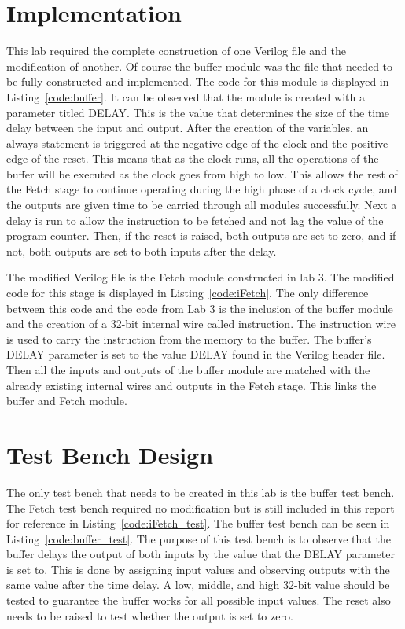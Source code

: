 \documentclass{article}
\newcommand{\Verilog}[3]{
  \lstset{language=Verilog}
  \lstset{backgroundcolor=\color{listinggray},rulecolor=\color{blue}}
  \lstset{linewidth=\textwidth}
  \lstset{commentstyle=\textit, stringstyle=\upshape,showspaces=false}
  \lstset{frame=tb}
  
}
\begin{document}
\section{Implementation}
This lab required the complete construction of one Verilog file and the modification of another. Of course the buffer module was the file that needed to be fully constructed and implemented. The code for this module is displayed in Listing~\ref{code:buffer}. It can be observed that the module is created with a parameter titled DELAY. This is the value that determines the size of the time delay between the input and output. After the creation of the variables, an always statement is triggered at the negative edge of the clock and the positive edge of the reset. This means that as the clock runs, all the operations of the buffer will be executed as the clock goes from high to low. This allows the rest of the Fetch stage to continue operating during the high phase of a clock cycle, and the outputs are given time to be carried through all modules successfully. Next a delay is run to allow the instruction to be fetched and not lag the value of the program counter. Then, if the reset is raised, both outputs are set to zero, and if not, both outputs are set to both inputs after the delay. 

The modified Verilog file is the Fetch module constructed in lab 3. The modified code for this stage is displayed in Listing~\ref{code:iFetch}. The only difference between this code and the code from Lab 3 is the inclusion of the buffer module and the creation of a 32-bit internal wire called instruction. The instruction wire is used to carry the instruction from the memory to the buffer. The buffer's DELAY parameter is set to the value DELAY found in the Verilog header file. Then all the inputs and outputs of the buffer module are matched with the already existing internal wires and outputs in the Fetch stage. This links the buffer and Fetch module.

\Verilog{Verilog code for implementing a buffer.}{code:buffer}{H:/MIPS-Lab/code/1_fetch/buffer_ifid.v}

\Verilog{Verilog code for modifying the iFetch stage.}{code:iFetch}{H:/MIPS-Lab/code/1_fetch/iFetch.v}

\section{Test Bench Design}
The only test bench that needs to be created in this lab is the buffer test bench. The Fetch test bench required no modification but is still included in this report for reference in Listing~\ref{code:iFetch_test}. The buffer test bench can be seen in Listing~\ref{code:buffer_test}. The purpose of this test bench is to observe that the buffer delays the output of both inputs by the value that the DELAY parameter is set to. This is done by assigning input values and observing outputs with the same value after the time delay. A low, middle, and high 32-bit value should be tested to guarantee the buffer works for all possible input values. The reset also needs to be raised to test whether the output is set to zero.
\end{document}
